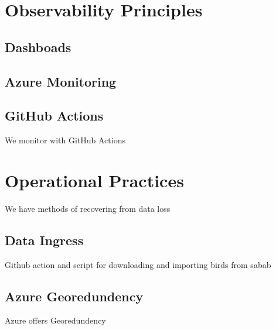 \documentclass[a4paper]{article}
\begin{document}
\newpage
\section{Observability Principles}

\subsection{Dashboads}
\subsection{Azure Monitoring}
\subsection{GitHub Actions}
We monitor with GitHub Actions

\newpage
\section{Operational Practices}
We have methods of recovering from data loss
\subsection{Data Ingress}
Github action and script for downloading and importing birds from sabab
\subsection{Azure Georedundency}
Azure offers Georedundency
\end{document}
